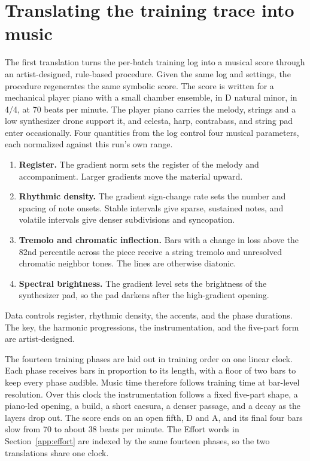 \section{Translating the training trace into music}
\label{app:music}

The first translation turns the per-batch training log into a musical score through an artist-designed, rule-based procedure.
Given the same log and settings, the procedure regenerates the same symbolic score.
The score is written for a mechanical player piano with a small chamber ensemble, in D natural minor, in 4/4, at 70 beats per minute.
The player piano carries the melody, strings and a low synthesizer drone support it, and celesta, harp, contrabass, and string pad enter occasionally.
Four quantities from the log control four musical parameters, each normalized against this run's own range.
\begin{enumerate}
\item \textbf{Register.} The gradient norm sets the register of the melody and accompaniment. Larger gradients move the material upward.
\item \textbf{Rhythmic density.} The gradient sign-change rate sets the number and spacing of note onsets. Stable intervals give sparse, sustained notes, and volatile intervals give denser subdivisions and syncopation.
\item \textbf{Tremolo and chromatic inflection.} Bars with a change in loss above the 82nd percentile across the piece receive a string tremolo and unresolved chromatic neighbor tones. The lines are otherwise diatonic.
\item \textbf{Spectral brightness.} The gradient level sets the brightness of the synthesizer pad, so the pad darkens after the high-gradient opening.
\end{enumerate}

Data controls register, rhythmic density, the accents, and the phase durations.
The key, the harmonic progressions, the instrumentation, and the five-part form are artist-designed.

The fourteen training phases are laid out in training order on one linear clock.
Each phase receives bars in proportion to its length, with a floor of two bars to keep every phase audible.
Music time therefore follows training time at bar-level resolution.
Over this clock the instrumentation follows a fixed five-part shape, a piano-led opening, a build, a short caesura, a denser passage, and a decay as the layers drop out.
The score ends on an open fifth, D and A, and its final four bars slow from 70 to about 38 beats per minute.
The Effort words in Section~\ref{app:effort} are indexed by the same fourteen phases, so the two translations share one clock.

